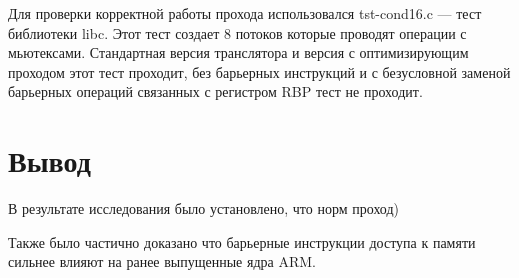 Для проверки корректной работы прохода использовался tst-cond16.c --- тест библиотеки libc. Этот тест создает 8 потоков которые проводят операции с мьютексами. Стандартная версия транслятора и версия с оптимизирующим проходом этот тест проходит, без барьерных инструкций и с безусловной заменой барьерных операций связанных с регистром RBP тест не проходит.

\section{Вывод}

В результате исследования было установлено, что норм проход)

Также было частично доказано что барьерные инструкции доступа к памяти сильнее влияют на ранее выпущенные ядра ARM.